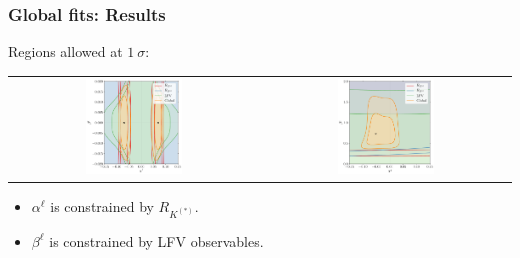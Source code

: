 \documentclass[mathserif, 10pt]{beamer}
\begin{document}
\begin{frame}
    \frametitle{Global fits: Results}
    Regions allowed at $1~\sigma$:
    \begin{center}
        \begin{tabular}{cc}
            \includegraphics[width=0.4\textwidth]{figures/alphabeta_l.pdf} & \includegraphics[width=0.4\textwidth]{figures/alphabeta_q.pdf}
        \end{tabular}
    \end{center}
    \begin{itemize}
        \item $\alpha^\ell$ is constrained by $R_{K^{(*)}}$.
\item $\beta^\ell$ is constrained by LFV observables.
    \end{itemize}
\end{frame}
\end{document}
